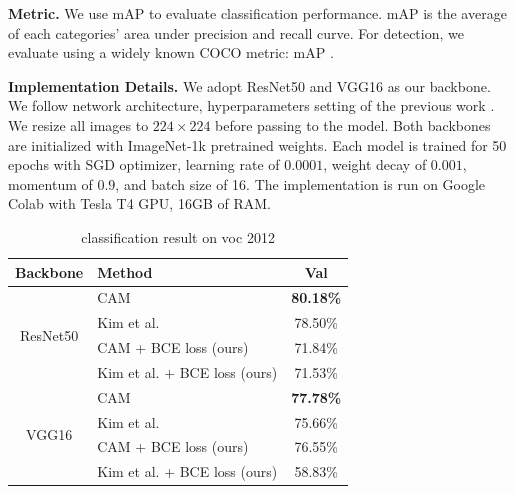 \documentclass[conference]{IEEEtran}
\begin{document}
\textbf{Metric.} We use mAP to evaluate classification performance. mAP is the average of each categories' area under precision and recall curve. For detection, we evaluate using a widely known COCO metric: mAP \cite{lin2015microsoft}.

\textbf{Implementation Details.} We adopt ResNet50 \cite{7780459} and VGG16 \cite{simonyan2015deep} as our backbone. We follow network architecture, hyperparameters setting of the previous work \cite{kim2022bridging}. We resize all images to $224\times224$ before passing to the model. Both backbones are initialized with ImageNet-1k \cite{ILSVRC15} pretrained weights. Each model is trained for 50 epochs with SGD optimizer, learning rate of $0.0001$, weight decay of $0.001$, momentum of $0.9$, and batch size of 16. The implementation is run on Google Colab with Tesla T4 GPU, 16GB of RAM.


\begin{table}[t]
    \centering
    \caption{classification result on voc 2012}
    \label{tab:classification_map_voc_2012}
    \begin{tabular}{|c|l|c|}
        \hline
        Backbone                     & Method                                              & Val                             \\
        \hline
        \multirow[c]{4}{*}{ResNet50} & CAM\cite{zhou2015cnnlocalization}                   & \color{red} \bfseries{80.18\%}  \\
                                     & Kim et al. \cite{kim2022bridging}                   & 78.50\%                         \\
                                     & CAM\cite{zhou2015cnnlocalization} + BCE loss (ours) & 71.84\%                         \\
                                     & Kim et al. \cite{kim2022bridging} + BCE loss (ours) & 71.53\%                         \\
        \hline
        \multirow[c]{4}{*}{VGG16}    & CAM\cite{zhou2015cnnlocalization}                   & \color{blue} \bfseries{77.78\%} \\
                                     & Kim et al. \cite{kim2022bridging}                   & 75.66\%                         \\
                                     & CAM\cite{zhou2015cnnlocalization} + BCE loss (ours) & 76.55\%                         \\
                                     & Kim et al. \cite{kim2022bridging} + BCE loss (ours) & 58.83\%                         \\
        \hline
    \end{tabular}
\end{table}
\end{document}

